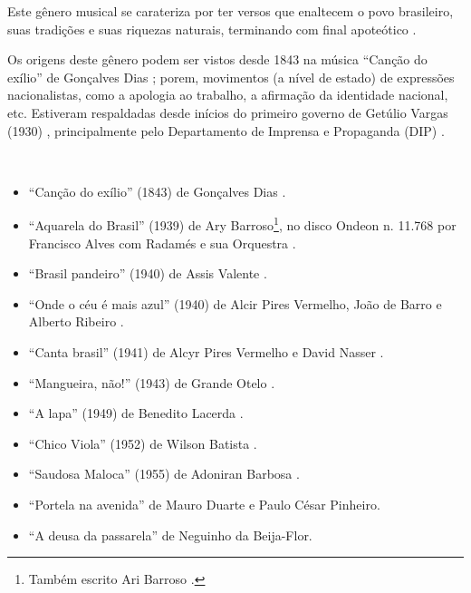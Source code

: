 Este gênero musical se carateriza por ter versos que enaltecem o povo brasileiro, 
suas tradições e suas riquezas naturais, terminando com final apoteótico  \cite[pp. 73]{diniz2006almanaque}.

Os origens deste gênero podem ser vistos desde 1843 na música ``Canção do exílio'' de Gonçalves Dias \cite[pp. 128]{perna2002samba};
porem, movimentos (a nível de estado) de expressões nacionalistas, como a apologia ao trabalho,
a afirmação da identidade nacional, etc.
Estiveram respaldadas desde inícios do primeiro governo de Getúlio Vargas (1930) \cite[pp. 67]{haussen2001radio},
principalmente pelo Departamento de Imprensa e Propaganda (DIP) \cite[pp. 74]{fenerick2005nem}.
\begin{example} ~

\begin{itemize}
\item ``Canção do exílio'' (1843) de Gonçalves Dias \cite[pp. 128]{perna2002samba}.
\item ``Aquarela do Brasil'' (1939) de Ary Barroso\footnote{Também escrito Ari Barroso  \cite[pp. 685]{marcondes1977enciclopediav2}.},
no disco Ondeon n. 11.768 por Francisco Alves com Radamés e sua Orquestra  \cite[pp. 685]{marcondes1977enciclopediav2} \cite[pp. 73]{diniz2006almanaque} \cite[pp. 128]{perna2002samba}.

\item ``Brasil pandeiro'' (1940) de Assis Valente \cite{subgenerosdosamba2} \cite[pp. 920]{marcondes1977enciclopediav2}.
\item ``Onde o céu é mais azul'' (1940) de Alcir Pires Vermelho, João de Barro e Alberto Ribeiro \cite[pp. 67]{haussen2001radio} \cite[pp. 1060]{marcondes1977enciclopediav2}.
\item ``Canta brasil'' (1941) de Alcyr Pires Vermelho e David Nasser \cite[pp. 53]{chediak2004101} \cite[pp. 929]{marcondes1977enciclopediav2}.
\item ``Mangueira, não!'' (1943) de Grande Otelo \cite{subgenerosdosamba2}.
\item ``A lapa'' (1949) de Benedito Lacerda \cite{subgenerosdosamba2}.
\item ``Chico Viola'' (1952) de Wilson Batista \cite{subgenerosdosamba2}.
\item ``Saudosa Maloca'' (1955) de Adoniran Barbosa \cite{subgenerosdosamba2}.

\item ``Portela na avenida''  de Mauro Duarte e Paulo César Pinheiro.
\item ``A deusa da passarela'' de Neguinho da Beija-Flor.

\end{itemize}
\end{example}

